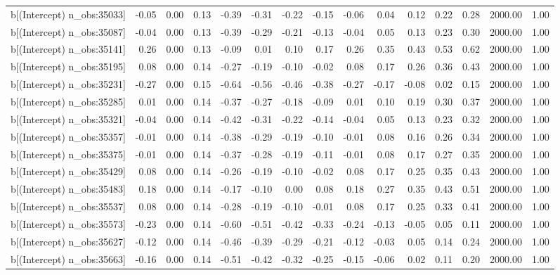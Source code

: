 \begin{table}[ht]
\begin{tabular}{rrrrrrrrrrrrrrr}
  b[(Intercept) n\_obs:35033] & -0.05 & 0.00 & 0.13 & -0.39 & -0.31 & -0.22 & -0.15 & -0.06 & 0.04 & 0.12 & 0.22 & 0.28 & 2000.00 & 1.00 \\ 
  b[(Intercept) n\_obs:35087] & -0.04 & 0.00 & 0.13 & -0.39 & -0.29 & -0.21 & -0.13 & -0.04 & 0.05 & 0.13 & 0.23 & 0.30 & 2000.00 & 1.00 \\ 
  b[(Intercept) n\_obs:35141] & 0.26 & 0.00 & 0.13 & -0.09 & 0.01 & 0.10 & 0.17 & 0.26 & 0.35 & 0.43 & 0.53 & 0.62 & 2000.00 & 1.00 \\ 
  b[(Intercept) n\_obs:35195] & 0.08 & 0.00 & 0.14 & -0.27 & -0.19 & -0.10 & -0.02 & 0.08 & 0.17 & 0.26 & 0.36 & 0.43 & 2000.00 & 1.00 \\ 
  b[(Intercept) n\_obs:35231] & -0.27 & 0.00 & 0.15 & -0.64 & -0.56 & -0.46 & -0.38 & -0.27 & -0.17 & -0.08 & 0.02 & 0.15 & 2000.00 & 1.00 \\ 
  b[(Intercept) n\_obs:35285] & 0.01 & 0.00 & 0.14 & -0.37 & -0.27 & -0.18 & -0.09 & 0.01 & 0.10 & 0.19 & 0.30 & 0.37 & 2000.00 & 1.00 \\ 
  b[(Intercept) n\_obs:35321] & -0.04 & 0.00 & 0.14 & -0.42 & -0.31 & -0.22 & -0.14 & -0.04 & 0.05 & 0.13 & 0.23 & 0.32 & 2000.00 & 1.00 \\ 
  b[(Intercept) n\_obs:35357] & -0.01 & 0.00 & 0.14 & -0.38 & -0.29 & -0.19 & -0.10 & -0.01 & 0.08 & 0.16 & 0.26 & 0.34 & 2000.00 & 1.00 \\ 
  b[(Intercept) n\_obs:35375] & -0.01 & 0.00 & 0.14 & -0.37 & -0.28 & -0.19 & -0.11 & -0.01 & 0.08 & 0.17 & 0.27 & 0.35 & 2000.00 & 1.00 \\ 
  b[(Intercept) n\_obs:35429] & 0.08 & 0.00 & 0.14 & -0.26 & -0.19 & -0.10 & -0.02 & 0.08 & 0.17 & 0.25 & 0.35 & 0.43 & 2000.00 & 1.00 \\ 
  b[(Intercept) n\_obs:35483] & 0.18 & 0.00 & 0.14 & -0.17 & -0.10 & 0.00 & 0.08 & 0.18 & 0.27 & 0.35 & 0.43 & 0.51 & 2000.00 & 1.00 \\ 
  b[(Intercept) n\_obs:35537] & 0.08 & 0.00 & 0.14 & -0.28 & -0.19 & -0.10 & -0.01 & 0.08 & 0.17 & 0.25 & 0.33 & 0.41 & 2000.00 & 1.00 \\ 
  b[(Intercept) n\_obs:35573] & -0.23 & 0.00 & 0.14 & -0.60 & -0.51 & -0.42 & -0.33 & -0.24 & -0.13 & -0.05 & 0.05 & 0.11 & 2000.00 & 1.00 \\ 
  b[(Intercept) n\_obs:35627] & -0.12 & 0.00 & 0.14 & -0.46 & -0.39 & -0.29 & -0.21 & -0.12 & -0.03 & 0.05 & 0.14 & 0.24 & 2000.00 & 1.00 \\ 
  b[(Intercept) n\_obs:35663] & -0.16 & 0.00 & 0.14 & -0.51 & -0.42 & -0.32 & -0.25 & -0.15 & -0.06 & 0.02 & 0.11 & 0.20 & 2000.00 & 1.00 \\ 

\end{tabular}
\end{table}
